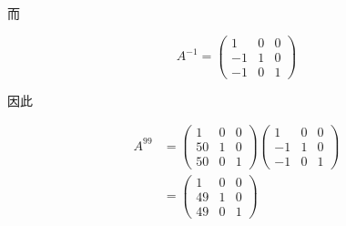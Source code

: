 \documentclass[10pt]{article}
\begin{document}
\begin{CJK}{UTF8}{mj}而\end{CJK}
$$
A^{-1}=\left(\begin{array}{ccc}
1 & 0 & 0 \\
-1 & 1 & 0 \\
-1 & 0 & 1
\end{array}\right)
$$
\begin{CJK}{UTF8}{mj}因此\end{CJK}
$$
\begin{aligned}
A^{99} &=\left(\begin{array}{ccc}
1 & 0 & 0 \\
50 & 1 & 0 \\
50 & 0 & 1
\end{array}\right)\left(\begin{array}{ccc}
1 & 0 & 0 \\
-1 & 1 & 0 \\
-1 & 0 & 1
\end{array}\right) \\
&=\left(\begin{array}{ccc}
1 & 0 & 0 \\
49 & 1 & 0 \\
49 & 0 & 1
\end{array}\right)
\end{aligned}
$$
\end{document}
